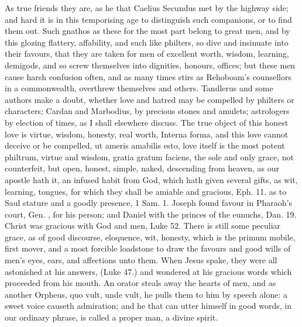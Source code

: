 {As true friends they are, as he that Caelius Secundus met by the
highway side; and hard it is in this temporising age to distinguish
such companions, or to find them out. Such gnathos as these for the
most part belong to great men, and by this glozing flattery,
affability, and such like philters, so dive and insinuate into their
favours, that they are taken for men of excellent worth, wisdom,
learning, demigods, and so screw themselves into dignities, honours,
offices; but these men cause harsh confusion often, and as many times
stirs as Rehoboam's counsellors in a commonwealth, overthrew themselves
and others. Tandlerus and some authors make a doubt, whether love and
hatred may be compelled by philters or characters; Cardan and
Marbodius, by precious stones and amulets; astrologers by election of
times, \etc{} as I shall elsewhere discuss. The true object of this
honest love is virtue, wisdom, honesty, real worth, Interna
forma, and this love cannot deceive or be compelled, ut ameris amabilis
esto, love itself is the most potent philtrum, virtue and wisdom,
gratia gratum faciens, the sole and only grace, not counterfeit, but
open, honest, simple, naked, descending from heaven, as our
apostle hath it, an infused habit from God, which hath given several
gifts, as wit, learning, tongues, for which they shall be amiable and
gracious, Eph.  11. as to Saul stature and a goodly presence, 1 Sam.
 1. Joseph found favour in Pharaoh's court, Gen. , for
his person; and Daniel with the princes of the eunuchs, Dan. 
19. Christ was gracious with God and men, Luke  52. There is still
some peculiar grace, as of good discourse, eloquence, wit, honesty,
which is the primum mobile, first mover, and a most forcible loadstone
to draw the favours and good wills of men's eyes, ears, and affections
unto them. When Jesus spake, they were all astonished at his answers,
(Luke  47.) and wondered at his gracious words which proceeded from
his mouth. An orator steals away the hearts of men, and as another
Orpheus, quo vult, unde vult, he pulls them to him by speech alone: a
sweet voice causeth admiration; and he that can utter himself in good
words, in our ordinary phrase, is called a proper man, a divine spirit.

}
